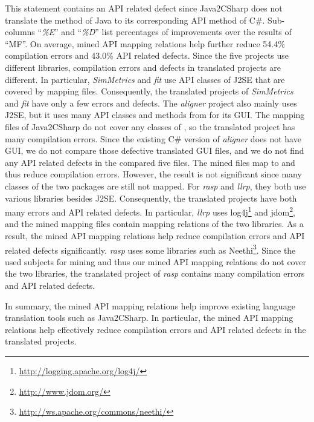 This statement contains an API related defect since Java2CSharp does not translate the  method of Java to its corresponding API method of C\#. Sub-columns ``\emph{\%E}'' and ``\emph{\%D}'' list
percentages of improvements over the results of ``MF''. On average,
mined API mapping relations help further reduce 54.4\% compilation errors
and 43.0\% API related defects. Since the five projects use different libraries,
compilation errors and defects in translated projects are different. In particular,
\emph{SimMetrics} and \emph{fit} use API classes of J2SE that are
covered by mapping files. Consequently, the translated projects of
\emph{SimMetrics} and \emph{fit} have only a few errors and defects. The
\emph{aligner} project also mainly uses J2SE, but it uses many API
classes and methods from  for its GUI. The mapping
files of Java2CSharp do not cover any classes of ,
so the translated project has many compilation errors. Since the existing C\#
version of \emph{aligner} does not have GUI, we do not compare those
defective translated GUI files, and we do not find any API related defects in the compared five files. The mined
files map  to  and
thus reduce compilation errors. However, the result is not
significant since many classes of the two packages are still not
mapped. For \emph{rasp} and \emph{llrp}, they both use various
libraries besides J2SE. Consequently, the translated projects have
both many errors and API related defects. In particular, \emph{llrp} uses
log4j\footnote{\url{http://logging.apache.org/log4j/}} and
jdom\footnote{\url{http://www.jdom.org/}}, and the mined mapping
files contain mapping relations of the two libraries. As a result,
the mined API mapping relations help reduce compilation errors and
API related defects significantly. \emph{rasp} uses some libraries such as
Neethi\footnote{\url{http://ws.apache.org/commons/neethi/}}. Since the used
subjects for mining and thus our mined API mapping relations do not cover the
two libraries, the translated project of \emph{rasp} contains many
compilation errors and API related defects.

In summary, the mined API mapping relations help improve existing language
translation tools such as Java2CSharp. In particular, the mined API
mapping relations help effectively reduce compilation errors and
API related defects in the translated projects.

